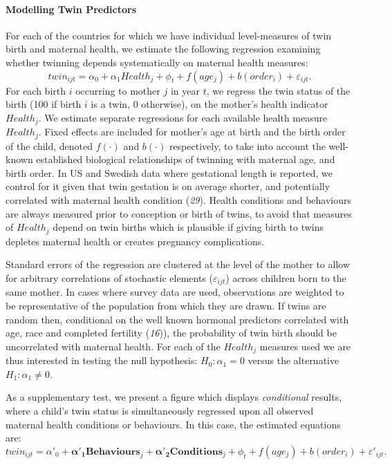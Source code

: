 \documentclass[11pt]{article}
\begin{document}
\paragraph{Modelling Twin Predictors}
For each of the countries for which we have individual level-measures of twin birth and maternal health, we estimate the following regression examining whether twinning depends systematically on maternal health measures:
\begin{equation}
  \label{reg:twinuncond}
  twin_{ijt}=\alpha_0 + \alpha_1 Health_j + \phi_t + f(age_j) + b(order_i) + \varepsilon_{ijt}.
\end{equation}
For each birth $i$ occurring to mother $j$ in year $t$, we regress the twin status of the birth (100 if birth $i$ is a twin, 0 otherwise), on the mother's health indicator $Health_j$. We estimate separate regressions for each available health measure $Health_j$. Fixed effects are included for mother's age at birth and the birth order of the child, denoted $f(\cdot)$ and $b(\cdot)$ respectively, to take into account the well-known established biological relationships of twinning with maternal age, and birth order. In US and Swedish data where gestational length is reported, we control for it given that twin gestation is on average shorter, and potentially correlated with maternal health condition (\emph{29}). Health conditions and behaviours are always measured prior to conception or birth of twins, to avoid that measures of $Health_j$ depend on twin births which is plausible if giving birth to twins depletes maternal health or creates pregnancy complications.

Standard errors of the regression are clustered at the level of the mother to allow for arbitrary correlations of stochastic elements ($\varepsilon_{ijt}$) across children born to the same mother. In cases where survey data are used, observations are weighted to be representative of the population from which they are drawn. If twins are random then, conditional on the well known  hormonal predictors correlated with age, race and completed fertility (\emph{16})), the probability of twin birth should be uncorrelated with maternal health. For each of the $Health_j$ measures used we are thus interested in testing the null hypothesis: $H_0: \alpha_1=0$ versus the alternative $H_1: \alpha_1\neq0$.

As a supplementary test, we present a figure which displays \emph{conditional} results, where a child's twin status is simultaneously regressed upon all observed maternal health conditions or behaviours.  In this case, the estimated equations are:
\begin{equation}
  \label{reg:twincond}
  twin_{ijt}=\alpha'_0 + \bm{\alpha'_1} \bm{Behaviours}_j + \bm{\alpha'_2} \bm{Conditions}_j + \phi_t + f(age_j) + b(order_i) + \varepsilon'_{ijt}.
\end{equation}
\end{document}
